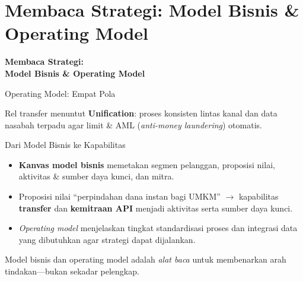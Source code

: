 \documentclass[aspectratio=169, table]{beamer}
\newcommand{\sectionframe}[1]{%
  \begin{frame}{\hfill}
    \centering
    \Huge{\textbf{#1}}
  \end{frame}
}
\newcommand{\takeaway}[1]{%
  \vspace{4pt}
  {\footnotesize #1}
}
\begin{document}
\section{Membaca Strategi: Model Bisnis \& Operating Model}
\sectionframe{Membaca Strategi:\\ Model Bisnis \& Operating Model}

\begin{frame}{Operating Model: Empat Pola}
  \vspace{4pt}
  \centering

  \takeaway{Rel transfer menuntut \textbf{Unification}: proses konsisten lintas
  kanal dan data nasabah terpadu agar limit \& AML
  (\emph{anti-money laundering}) otomatis.}
\end{frame}

\begin{frame}{Dari Model Bisnis ke Kapabilitas}
  \vspace{6pt}
  \begin{itemize}
    \item \textbf{Kanvas model bisnis} memetakan segmen pelanggan, proposisi
          nilai, aktivitas \& sumber daya kunci, dan mitra.
    \item Proposisi nilai ``perpindahan dana instan bagi UMKM'' $\rightarrow$
          kapabilitas \textbf{transfer} dan \textbf{kemitraan API} menjadi
          aktivitas serta sumber daya kunci.
    \item \emph{Operating model} menjelaskan tingkat standardisasi proses dan
          integrasi data yang dibutuhkan agar strategi dapat dijalankan.
  \end{itemize}
  \takeaway{Model bisnis dan operating model adalah \emph{alat baca} untuk
  membenarkan arah tindakan---bukan sekadar pelengkap.}
\end{frame}
\end{document}
